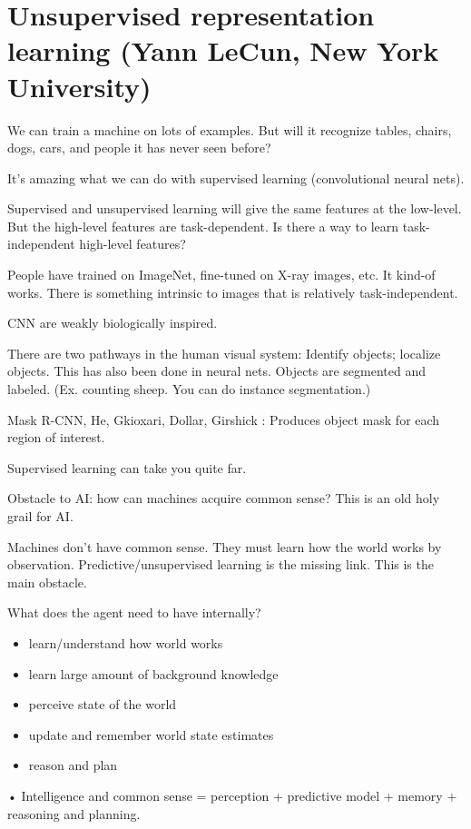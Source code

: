 \section{Unsupervised representation learning (Yann LeCun, New York University)}


We can train a machine on lots of examples. But will it recognize tables, chairs, dogs, cars, and people it has never seen before?

It's amazing what we can do with supervised learning (convolutional neural nets). 

Supervised and unsupervised learning will give the same features at the low-level. But the high-level features are task-dependent. Is there a way to learn task-independent high-level features?

People have trained on ImageNet, fine-tuned on X-ray images, etc. It kind-of works. There is something intrinsic to images that is relatively task-independent.

CNN are weakly biologically inspired. 

There are two pathways in the human visual system: Identify objects; localize objects. This has also been done in neural nets.
Objects are segmented and labeled. (Ex. counting sheep. You can do instance segmentation.)

Mask R-CNN, He, Gkioxari, Dollar, Girshick : Produces object mask for each region of interest.

Supervised learning can take you quite far. 

Obstacle to AI: how can machines acquire common sense? This is an old holy grail for AI. 

Machines don't have common sense. They must learn how the world works by observation. Predictive/unsupervised learning is the missing link.
This is the main obstacle. 

What does the agent need to have internally?
\begin{itemize}
\item
learn/understand how world works
\item
learn large amount of background knowledge
\item
perceive state of the world
\item
update and remember world state estimates
\item
reason and plan
\end{itemize}•
Intelligence and common sense = perception + predictive model + memory + reasoning and planning.

